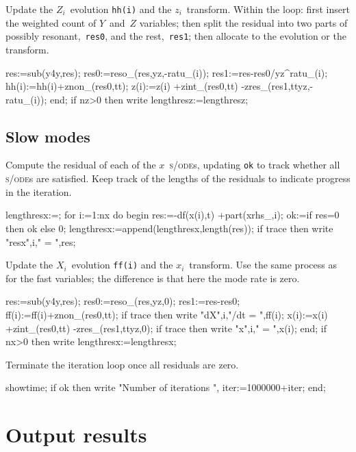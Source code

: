 \documentclass[11pt,a5paper]{article}
\def\sde{\textsc{s/ode}}
\begin{document}
Update the $Z_i$~evolution \verb|hh(i)| and the $z_i$~transform.
Within the loop: first insert the weighted count of $Y$~and~$Z$ variables;
then split the residual into two parts of possibly resonant,~\verb|res0|, and the rest,~\verb|res1|; then allocate to the evolution or the transform.
\begin{reduce}
    res:=sub(y4y,res);
    res0:=reso_(res,yz,-ratu_(i));
    res1:=res-res0/yz^ratu_(i);
    hh(i):=hh(i)+znon_(res0,tt);
    z(i):=z(i) +zint_(res0,tt) -zres_(res1,ttyz,-ratu_(i));
  end;
  if nz>0 then write lengthresz:=lengthresz;
\end{reduce}





\subsection{Slow modes}

Compute the residual of each of the $x$~\sde{}s, updating \verb|ok| to track whether all \sde{}s are satisfied.  Keep track of the lengths of the residuals to indicate progress in the iteration.
\begin{reduce}
  lengthresx:={};
  for i:=1:nx do begin
    res:=-df(x(i),t) +part(xrhs_,i);
    ok:=if res=0 then ok else 0;
    lengthresx:=append(lengthresx,{length(res)});
    if trace then write "resx",i," = ",res;
\end{reduce}

Update the $X_i$~evolution \verb|ff(i)| and the $x_i$~transform.
Use the same process as for the fast variables; the difference is that here the mode rate is zero.
\begin{reduce}
    res:=sub(y4y,res);
    res0:=reso_(res,yz,0);
    res1:=res-res0;
    ff(i):=ff(i)+znon_(res0,tt);
    if trace then write "dX",i,"/dt = ",ff(i);
    x(i):=x(i) +zint_(res0,tt) -zres_(res1,ttyz,0);
    if trace then write "x",i," = ",x(i);
  end;
  if nx>0 then write lengthresx:=lengthresx;
\end{reduce}

Terminate the iteration loop once all residuals are zero.
\begin{reduce}
  showtime;
  if ok then write "Number of iterations ",
    iter:=1000000+iter;
end;
\end{reduce}





\section{Output results}
\end{document}
